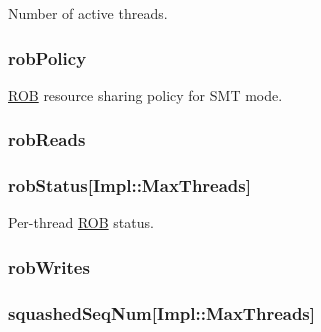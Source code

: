 \label{classROB_a88377f855dbf5adeeecb06b5bb821d35}
Number of active threads. \hypertarget{classROB_a802d14d10f8445b65f5c9d50ea0c6794}{
\subsubsection[{robPolicy}]{ {\bf robPolicy}}}
\label{classROB_a802d14d10f8445b65f5c9d50ea0c6794}
\hyperlink{classROB}{ROB} resource sharing policy for SMT mode. \hypertarget{classROB_a982979b3e3e933cd62fa40789af9153d}{
\subsubsection[{robReads}]{ {\bf robReads}}}
\label{classROB_a982979b3e3e933cd62fa40789af9153d}
\hypertarget{classROB_a23d5e98a57c975ddb5106a14af875f9b}{
\subsubsection[{robStatus}]{ {\bf robStatus}\mbox{[}Impl::MaxThreads\mbox{]}}}
\label{classROB_a23d5e98a57c975ddb5106a14af875f9b}
Per-\/thread \hyperlink{classROB}{ROB} status. \hypertarget{classROB_a4c459f15b21d3f34da46fe0ca2280cf6}{
\subsubsection[{robWrites}]{ {\bf robWrites}}}
\label{classROB_a4c459f15b21d3f34da46fe0ca2280cf6}
\hypertarget{classROB_a97d5a7e4630ad1d017909f7504b9ec32}{
\subsubsection[{squashedSeqNum}]{ {\bf squashedSeqNum}\mbox{[}Impl::MaxThreads\mbox{]}}}
